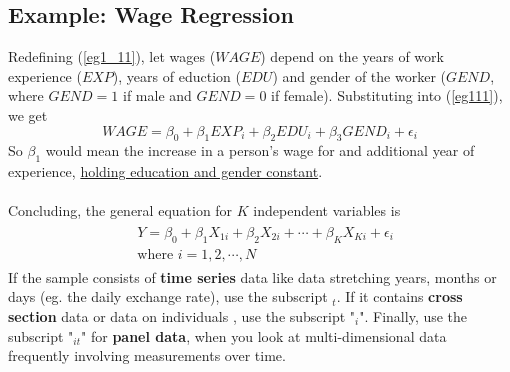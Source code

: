 \documentclass[11pt]{article}
\begin{document}
\subsection{Example: Wage Regression}
Redefining (\ref{eg1_11}), let wages ($WAGE$) depend on the years of work experience ($EXP$), years of eduction ($EDU$) and gender of the worker ($GEND$, where $GEND=1$ if male and $GEND=0$ if female). Substituting into (\ref{eg111}), we get
\begin{equation}
WAGE = \beta_0+ \beta_1 EXP_i + \beta_2 EDU_i + \beta_3 GEND_i + \epsilon_i \label{eg1_12}
\end{equation}
So $\beta_1$ would mean the increase in a person's wage for and additional year of experience, \underline{holding education and gender constant}.\\ \\
Concluding, the general equation for $K$ independent variables is 
\begin{align} \label{eg1_13}
\begin{split}
&Y= \beta_0 + \beta_1 X_{1i} + \beta_2 X_{2i} + \cdots + \beta_K X_{Ki} + \epsilon_i\\ &\text{where } i=1, 2, \cdots, N 
\end{split}
\end{align}
If the sample consists of \textbf{time series} data like data stretching years, months or days (eg. the daily exchange rate), use the subscript $_t$. If it contains \textbf{cross section} data or data on individuals , use the subscript "$_i$". Finally, 
use the subscript "$_{it}$" for \textbf{panel data}, when you look at multi-dimensional data frequently involving measurements over time.
\end{document}
